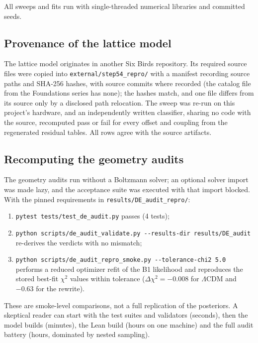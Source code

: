 All sweeps and fits run with single-threaded numerical libraries and
committed seeds.

\hypertarget{c.3-provenance-of-the-lattice-model}{%
\subsection{Provenance of the lattice
model}\label{c.3-provenance-of-the-lattice-model}}

The lattice model originates in another Six Birds repository. Its
required source files were copied into \texttt{external/\allowbreak step54\_\allowbreak repro/\allowbreak }
with a manifest recording source paths and SHA-256 hashes, with source
commits where recorded (the catalog file from the Foundations series has
none); the hashes match, and one file differs from its source only by a
disclosed path relocation. The sweep was re-run on this project's
hardware, and an independently written classifier, sharing no code with
the source, recomputed pass or fail for every offset and coupling from
the regenerated residual tables. All rows agree with the source
artifacts.

\hypertarget{c.4-recomputing-the-geometry-audits}{%
\subsection{Recomputing the geometry
audits}\label{c.4-recomputing-the-geometry-audits}}

The geometry audits run without a Boltzmann solver; an optional solver
import was made lazy, and the acceptance suite was executed with that
import blocked. With the pinned requirements in
\texttt{results/\allowbreak DE\_\allowbreak audit\_\allowbreak repro/\allowbreak }:

\begin{enumerate}
\def\labelenumi{\arabic{enumi}.}
\tightlist
\item
  \texttt{pytest\ tests/\allowbreak test\_\allowbreak de\_\allowbreak audit.py} passes (4 tests);
\item
  \texttt{python\ scripts/\allowbreak de\_\allowbreak audit\_\allowbreak validate.py\ -\allowbreak \/\allowbreak -\allowbreak results-\allowbreak dir\ results/\allowbreak DE\_\allowbreak audit}
  re-derives the verdicts with no mismatch;
\item
  \texttt{python\ scripts/\allowbreak de\_\allowbreak audit\_\allowbreak repro\_\allowbreak smoke.py\ -\allowbreak \/\allowbreak -\allowbreak tolerance-\allowbreak chi2\ 5.0}
  performs a reduced optimizer refit of the B1 likelihood and reproduces
  the stored best-fit \(\chi^2\) values within tolerance
  (\(\Delta\chi^2=-0.008\) for \(\Lambda\)CDM and \(-0.63\) for the
  rewrite).
\end{enumerate}

These are smoke-level comparisons, not a full replication of the
posteriors. A skeptical reader can start with the test suites and
validators (seconds), then the model builds (minutes), the Lean build
(hours on one machine) and the full audit battery (hours, dominated by
nested sampling).
